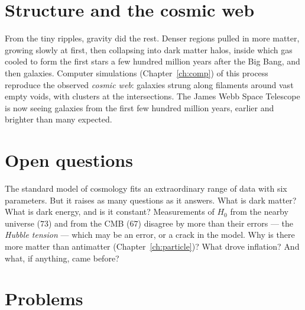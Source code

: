 \section{Structure and the cosmic web}

From the tiny ripples, gravity did the rest. Denser regions pulled in more matter, growing slowly at first, then collapsing into dark matter halos, inside which gas cooled to form the first stars a few hundred million years after the Big Bang, and then galaxies. Computer simulations (Chapter~\ref{ch:comp}) of this process reproduce the observed \emph{cosmic web}: galaxies strung along filaments around vast empty voids, with clusters at the intersections. The James Webb Space Telescope is now seeing galaxies from the first few hundred million years, earlier and brighter than many expected.

\section{Open questions}

The standard model of cosmology fits an extraordinary range of data with six parameters. But it raises as many questions as it answers. What is dark matter? What is dark energy, and is it constant? Measurements of $H_0$ from the nearby universe ($73$) and from the CMB ($67$) disagree by more than their errors --- the \emph{Hubble tension} --- which may be an error, or a crack in the model. Why is there more matter than antimatter (Chapter~\ref{ch:particle})? What drove inflation? And what, if anything, came before?

\section{Problems}

